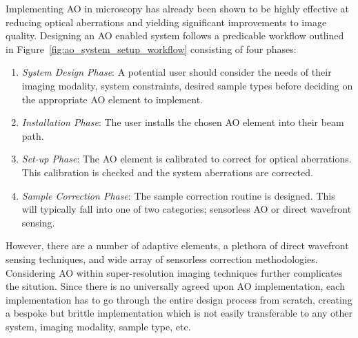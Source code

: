 Implementing AO in microscopy has already been shown to be highly 
effective at reducing optical aberrations and yielding significant 
improvements to image 
quality\cite{booth2014adaptive,girkin2009adaptive,fraisier2015adaptive,jesacher2011sensorless,
	jian2014wavefront}. Designing an AO enabled system follows a predicable 
workflow outlined in Figure~\ref{fig:ao_system_setup_workflow} 
consisting of four phases:

\begin{enumerate}
	\item \textit{System Design Phase}: A potential user should consider 
	the needs of their imaging modality, system constraints, desired 
	sample types before deciding on the appropriate AO element to 
	implement.
	\item \textit{Installation Phase}: The user installs the chosen AO 
	element into their beam path.
	\item \textit{Set-up Phase}: The AO element is calibrated to correct 
	for optical aberrations. This calibration is checked and the system 
	aberrations are corrected.
	\item \textit{Sample Correction Phase}: The sample correction routine 
	is designed. This will typically fall into one of two categories; 
	sensorless AO or direct wavefront sensing.
\end{enumerate}  

However, there are a number of adaptive elements\cite{olivier2002advanced}, 
a plethora of direct wavefront sensing techniques\cite{antonello2014optimisation,trumper2016instantaneous,
	schwertner2004measurement}, and wide array of 
sensorless correction methodologies\cite{burke2015adaptive,booth2002adaptive,
	fienup2003aberration,antonello2020multi,debarre2007image,murray2005wavefront}. 
Considering AO within super-resolution imaging techniques further complicates
the sitution\cite{debarre2008adaptive,booth2015aberrations,thomas2015enhanced}.
Since there is no universally agreed upon AO implementation, each 
implementation has to go through the entire design process from scratch, 
creating a bespoke but brittle implementation which is not easily transferable
to any other system, imaging modality, sample type, etc. 

